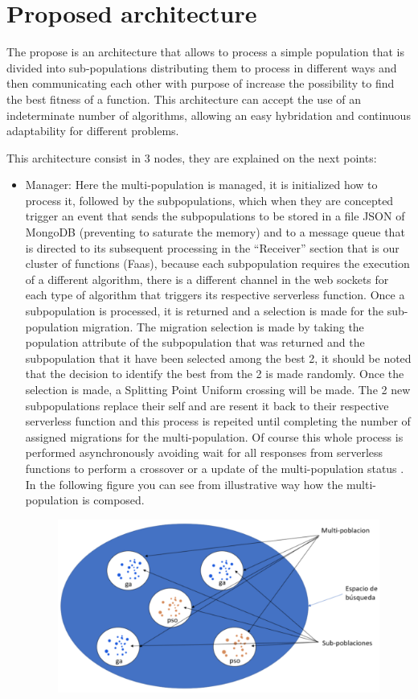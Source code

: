 \documentclass[runningheads]{llncs}
\begin{document}
\section{Proposed architecture}

The propose is an architecture that allows to process a simple population that is divided into sub-populations
distributing them to process in different ways and then communicating each other with purpose of increase the possibility
to find the best fitness of a function. This architecture can accept the use of an indeterminate number of algorithms, allowing
an easy hybridation and continuous adaptability for different problems.

This architecture consist in 3 nodes, they are explained on the next points:

\begin{itemize}
  \item Manager: Here the multi-population is managed, it is initialized how to process it, 
  followed by the subpopulations, which when they are concepted trigger an event that sends 
  the subpopulations to be stored in a file JSON of MongoDB (preventing to saturate the memory) 
  and to a message queue that is directed to its subsequent processing in the “Receiver” section 
  that is our cluster of functions (Faas), because each subpopulation requires the execution of a 
  different algorithm, there is a different channel in the web sockets for each type of algorithm 
  that triggers its respective serverless function.
  Once a subpopulation is processed, it is returned and a selection is made for the sub-population 
  migration. The migration selection is made by taking the population attribute of the subpopulation 
  that was returned and the subpopulation that it have been selected among the best 2, it should be 
  noted that the decision to identify the best from the 2 is made randomly. Once the selection is made, 
  a Splitting Point Uniform crossing will be made.
  The 2 new subpopulations replace their self and are resent it back to their respective
serverless function and this process is repeited until completing the number of assigned migrations
for the multi-population. Of course this whole process is performed asynchronously avoiding wait for all responses from serverless functions to perform a crossover or a
update of the multi-population status \cite{Lovbjerg2001,Jimeno2019}. In the following figure you can see from
illustrative way how the multi-population is composed.
\begin{figure}[htp]
  \includegraphics[width=\textwidth]{multipopulation.png}

\end{figure}
\end{itemize}
\end{document}
